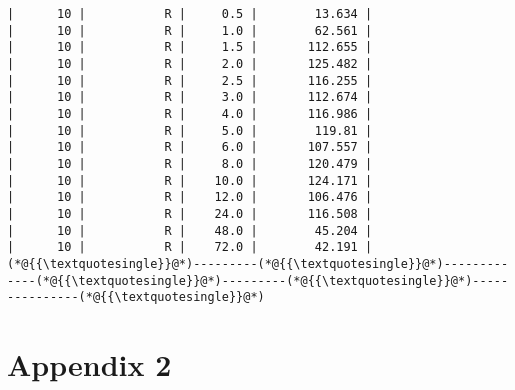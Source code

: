 \documentclass[12pt,a4paper]{article}
\begin{document}
\begin{lstlisting}
|      10 |           R |     0.5 |        13.634 |
|      10 |           R |     1.0 |        62.561 |
|      10 |           R |     1.5 |       112.655 |
|      10 |           R |     2.0 |       125.482 |
|      10 |           R |     2.5 |       116.255 |
|      10 |           R |     3.0 |       112.674 |
|      10 |           R |     4.0 |       116.986 |
|      10 |           R |     5.0 |        119.81 |
|      10 |           R |     6.0 |       107.557 |
|      10 |           R |     8.0 |       120.479 |
|      10 |           R |    10.0 |       124.171 |
|      10 |           R |    12.0 |       106.476 |
|      10 |           R |    24.0 |       116.508 |
|      10 |           R |    48.0 |        45.204 |
|      10 |           R |    72.0 |        42.191 |
(*@{{\textquotesingle}}@*)---------(*@{{\textquotesingle}}@*)-------------(*@{{\textquotesingle}}@*)---------(*@{{\textquotesingle}}@*)---------------(*@{{\textquotesingle}}@*)
\end{lstlisting}


\section{Appendix 2}
\end{document}
